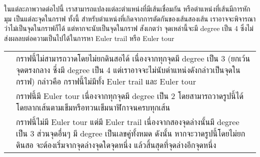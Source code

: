 \begin{example}
ในแต่ละภาพวาดต่อไปนี้ เราสามารถแปลงแต่ละตำแหน่งที่มีเส้นเชื่อมกัน หรือตำแหน่งที่เส้นมีการหักมุม เป็นแต่ละจุดในกราฟ \enskip ทั้งนี้ สำหรับตำแหน่งที่เกิดจากการตัดกันของเส้นสองเส้น เราอาจจะพิจารณาว่าไม่เป็นจุดในกราฟก็ได้ แต่หากจะนับเป็นจุดในกราฟ สังเกตว่า จุดเหล่านี้จะมี degree เป็น 4 ซึ่งไม่ส่งผลลบต่อความเป็นไปได้ในการหา Euler trail หรือ Euler tour
\begin{tabularx}{\linewidth}{@{}cX@{}}
& กราฟนี้ไม่สามารถวาดโดยไม่ยกดินสอได้ เนื่องจากทุกจุดมี degree เป็น 3 (ยกเว้นจุดตรงกลาง ซึ่งมี degree เป็น 4 แต่เราอาจจะไม่นับตำแหน่งดังกล่าวเป็นจุดในกราฟ) กล่าวคือ กราฟนี้ไม่มีทั้ง Euler trail และ Euler tour \\
& กราฟนี้มี Euler tour เนื่องจากทุกจุดมี degree เป็น 2 โดยสามารถวาดรูปนี้ได้โดยลากเส้นตามเข็มหรือทวนเข็มนาฬิกาจนครบทุกเส้น \\
& กราฟนี้ไม่มี Euler tour แต่มี Euler trail เนื่องจากสองจุดล่างนั้นมี degree เป็น 3 ส่วนจุดอื่นๆ มี degree เป็นเลขคู่ทั้งหมด \enskip ดังนั้น หากจะวาดรูปนี้โดยไม่ยกดินสอ จะต้องเริ่มจากจุดล่างจุดใดจุดหนึ่ง แล้วสิ้นสุดที่จุดล่างอีกจุดหนึ่ง
\end{tabularx}
\end{example}

